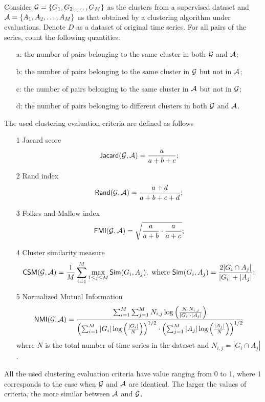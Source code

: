 \documentclass{statsoc}
\begin{document}
Consider ${\cal G}=\{G_1,G_2,\ldots,G_M\}$ as the clusters from a supervised dataset and ${\cal A}=\{A_1,A_2,\ldots,A_M\}$ as that obtained by a clustering algorithm under evaluations. Denote $D$ as a dataset of original time series. For all pairs of the series, count the following quantities:
\begin{itemize}
\item[a:] the number of pairs belonging to the same cluster in both $\cal G$ and $\cal A$;
\item[b:] the number of pairs belonging to the same cluster in $\cal G$ but not in $\cal A$;
\item[c:] the number of pairs belonging to the same cluster in $\cal A$ but not in $\cal G$;
\item[d:] the number of pairs belonging to different clusters in both $\cal G$ and $\cal A$. 
\end{itemize} 
The used clustering evaluation criteria are defined as follows 
\begin{itemize}
\item[1] Jacard score
\[{\sf Jacard}({\cal G},{\cal A})=\frac{a}{a+b+c};\]
\item[2] Rand index
\[{\sf Rand}({\cal G},{\cal A})=\frac{a+d}{a+b+c+d};\]
\item[3] Folkes and Mallow index
\[{\sf FMI}({\cal G},{\cal A})=\sqrt{\frac{a}{a+b}\cdot\frac{a}{a+c}};\]
\item[4] Cluster similarity measure
\[{\sf CSM}({\cal G},{\cal A})=\frac{1}{M}\sum_{i=1}^M\max_{1\leq j\leq M}{\sf Sim}(G_i,A_j),~\mbox{where}~{\sf Sim}(G_i,A_j)=\frac{2|G_i\cap A_j|}{|G_i|+|A_j|};\]
\item[5] Normalized Mutual Information
\[{\sf NMI}({\cal G},{\cal A})=\frac{\sum_{i=1}^M\sum_{j=1}^MN_{i,j}\log\left(\frac{N\cdot N_{i,j}}{|G_i|\cdot|A_j|}\right)}{\left(\sum_{i=1}^M|G_i|\log\left(\frac{|G_i|}{N}\right)\right)^{1/2}\cdot\left(\sum_{j=1}^M|A_j|\log\left(\frac{|A_j|}{N}\right)\right)^{1/2}}\]
where $N$ is the total number of time series in the dataset and $N_{i,j}=|G_i\cap A_j|$.
\end{itemize}
All the used clustering evaluation criteria have value ranging from 0 to 1, where 1 corresponds to the case when $\cal G$ and $\cal A$ are identical. The larger the values of criteria, the more similar between $\cal A$ and $\cal G$.
\end{document}
